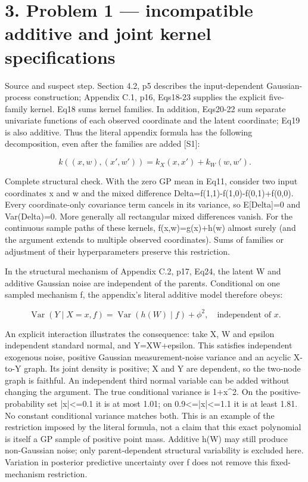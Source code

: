\documentclass[10pt]{article}
\begin{document}
\section*{3. Problem 1 — incompatible additive and joint kernel specifications}
Source and suspect step. Section 4.2, p5 describes the input-dependent Gaussian-process construction; Appendix C.1, p16, Eqs18-23 supplies the explicit five-family kernel. Eq18 sums kernel families. In addition, Eqs20-22 sum separate univariate functions of each observed coordinate and the latent coordinate; Eq19 is also additive. Thus the literal appendix formula has the following decomposition, even after the families are added [S1]:\par
\[k((x,w),(x',w'))=k_X(x,x')+k_W(w,w').\]\par
Complete structural check. With the zero GP mean in Eq11, consider two input coordinates x and w and the mixed difference Delta=f(1,1)-f(1,0)-f(0,1)+f(0,0). Every coordinate-only covariance term cancels in its variance, so E[Delta]=0 and Var(Delta)=0. More generally all rectangular mixed differences vanish. For the continuous sample paths of these kernels, f(x,w)=g(x)+h(w) almost surely (and the argument extends to multiple observed coordinates). Sums of families or adjustment of their hyperparameters preserve this restriction.\par
In the structural mechanism of Appendix C.2, p17, Eq24, the latent W and additive Gaussian noise are independent of the parents. Conditional on one sampled mechanism f, the appendix’s literal additive model therefore obeys:\par
\[\operatorname{Var}(Y\mid X=x,f)=\operatorname{Var}(h(W)\mid f)+\phi^2,\quad\text{independent of }x.\]\par
An explicit interaction illustrates the consequence: take X, W and epsilon independent standard normal, and Y=XW+epsilon. This satisfies independent exogenous noise, positive Gaussian measurement-noise variance and an acyclic X-to-Y graph. Its joint density is positive; X and Y are dependent, so the two-node graph is faithful. An independent third normal variable can be added without changing the argument. The true conditional variance is 1+x\textasciicircum{}2. On the positive-probability set |x|<=0.1 it is at most 1.01; on 0.9<=|x|<=1.1 it is at least 1.81. No constant conditional variance matches both. This is an example of the restriction imposed by the literal formula, not a claim that this exact polynomial is itself a GP sample of positive point mass. Additive h(W) may still produce non-Gaussian noise; only parent-dependent structural variability is excluded here. Variation in posterior predictive uncertainty over f does not remove this fixed-mechanism restriction.\par
\end{document}
